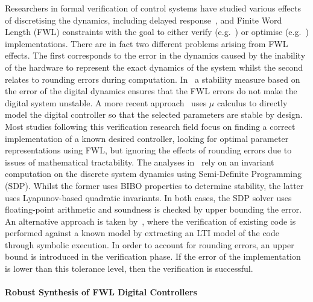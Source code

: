 \documentclass{sig-alternate-05-2015}
\begin{document}
Researchers in formal verification of control systems have studied various
effects of discretising the dynamics, including delayed
response~\cite{Duggirala2015}, and Finite Word Length (FWL) constraints with
the goal to either verify (e.g.~\cite{daes20161}) or optimise
(e.g.~\cite{oudjida2014design}) implementations.  There are in fact two
different problems arising from FWL effects.  The first corresponds to the
error in the dynamics caused by the inability of the hardware to represent
the exact dynamics of the system whilst the second relates to rounding
errors during computation.  In~\cite{fialho1994stability} a stability
measure based on the error of the digital dynamics ensures that the FWL
errors do not make the digital system unstable.  A more recent
approach~\cite{DBLP:journals/automatica/WuLCC09} uses $\mu$ calculus to
directly model the digital controller so that the selected parameters are
stable by design.  Most studies following this verification research field
focus on finding a correct implementation of a known desired controller,
looking for optimal parameter representations using FWL, but ignoring the
effects of rounding errors due to issues of mathematical tractability.  The
analyses in~\cite{DBLP:conf/hybrid/WangGRJF16, DBLP:conf/hybrid/RouxJG15}
rely on an invariant computation on the discrete system dynamics using
Semi-Definite Programming (SDP).  Whilst the former uses BIBO properties to
determine stability, the latter uses Lyapunov-based quadratic invariants. 
In both cases, the SDP solver uses floating-point arithmetic and soundness
is checked by upper bounding the error.  An alternative approach is taken
by~\cite{park2016scalable}, where the verification of existing code is
performed against a known model by extracting an LTI model of the code
through symbolic execution.  In order to account for rounding errors, an
upper bound is introduced in the verification phase.  If the error of the
implementation is lower than this tolerance level, then the verification is
successful.

\paragraph{Robust Synthesis of FWL Digital Controllers}
\end{document}

